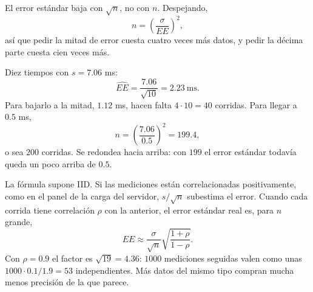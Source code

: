 \documentclass[11pt,letterpaper]{article}
\begin{document}
El error estándar baja con $\sqrt{n}$, no con $n$. Despejando,
\[
    n = \left( \frac{\sigma}{EE} \right)^2 ,
\]
así que pedir la mitad de error cuesta cuatro veces más datos, y
pedir la décima parte cuesta cien veces más.

\begin{center}
\end{center}

\begin{ejemplo}
    Diez tiempos con $s = 7.06$ ms:
    \[
        \widehat{EE} = \frac{7.06}{\sqrt{10}} = 2.23 \ \text{ms} .
    \]
    Para bajarlo a la mitad, $1.12$ ms, hacen falta $4 \cdot 10 = 40$
    corridas. Para llegar a $0.5$ ms,
    \[
        n = \left( \frac{7.06}{0.5} \right)^2 = 199.4 ,
    \]
    o sea $200$ corridas. Se redondea hacia arriba: con $199$ el error
    estándar todavía queda un poco arriba de $0.5$.
\end{ejemplo}

\begin{ojo}
    La fórmula supone IID. Si las mediciones están correlacionadas
    positivamente, como en el panel de la carga del servidor,
    $s / \sqrt{n}$ subestima el error. Cuando cada corrida tiene
    correlación $\rho$ con la anterior, el error estándar real es, para
    $n$ grande,
    \[
        EE \approx \frac{\sigma}{\sqrt{n}}
                   \sqrt{\frac{1 + \rho}{1 - \rho}} .
    \]
    Con $\rho = 0.9$ el factor es $\sqrt{19} = 4.36$: $1000$ mediciones
    seguidas valen como unas $1000 \cdot 0.1 / 1.9 = 53$
    independientes. Más datos del mismo tipo compran mucha menos
    precisión de la que parece.
\end{ojo}
\end{document}
